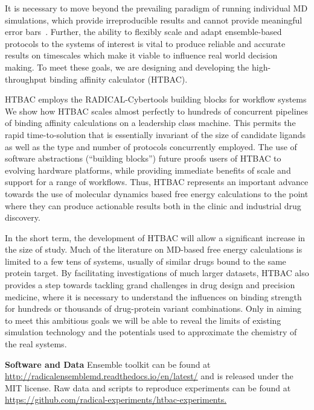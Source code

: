 
It is necessary to move beyond the prevailing paradigm of running individual
MD simulations, which provide irreproducible results and cannot provide
meaningful error bars~\cite{Bhati2017}. Further, the ability to flexibly
scale and adapt ensemble-based protocols to the systems of interest is vital
to produce reliable and accurate results on timescales which make it viable
to influence real world decision making. To meet these goals, we %
are 
designing and developing the high-throughput binding affinity calculator
(HTBAC).

HTBAC employs the RADICAL-Cybertools building blocks for workflow systems
 We
show how HTBAC  scales almost perfectly to
hundreds of concurrent pipelines of binding affinity calculations on a
leadership class machine. This permits the rapid time-to-solution that is
 essentially invariant of the size of candidate ligands as well as
the type and number of protocols concurrently employed. The use of software
abstractions (``building blocks'') future proofs users of HTBAC to evolving
hardware platforms, while providing immediate benefits of scale and support
for a range of workflows. Thus, HTBAC represents an important advance towards
the use of molecular dynamics based free energy calculations to the point
where they can produce actionable results both in the clinic and industrial
drug discovery.

In the short term, the development of HTBAC will allow a significant increase
in the size of study. Much of the literature on MD-based free energy
calculations is limited to a few tens of systems, usually of similar drugs
bound to the same protein target. By facilitating investigations of much
larger datasets, HTBAC also provides a step towards tackling grand challenges
in drug design and precision medicine, where it is necessary to understand
the influences on binding strength for hundreds or thousands of drug-protein
variant combinations. Only in aiming to meet this ambitious goals we will be
able to reveal the limits of existing simulation technology and the
potentials used to approximate the chemistry of the real systems.

\footnotesize \textbf{Software and Data} Ensemble toolkit can be found at
\url{http://radicalensemblemd.readthedocs.io/en/latest/} and is released
under the MIT license. Raw data and scripts to reproduce experiments can be
found at \url{https://github.com/radical-experiments/htbac-experiments.}
